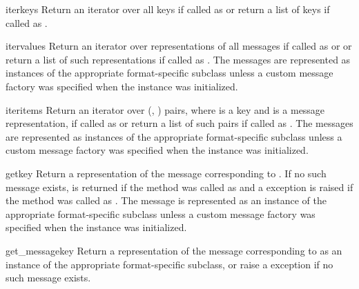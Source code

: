 \begin{methoddesc}{iterkeys}{}
Return an iterator over all keys if called as  or return a
list of keys if called as .
\end{methoddesc}

\begin{methoddesc}{itervalues}{}
Return an iterator over representations of all messages if called as
 or  or return a list of such
representations if called as . The messages are represented as
instances of the appropriate format-specific  subclass unless a
custom message factory was specified when the  instance was
initialized. 
\end{methoddesc}

\begin{methoddesc}{iteritems}{}
Return an iterator over (, ) pairs, where  is a
key and  is a message representation, if called as
 or return a list of such pairs if called as
. The messages are represented as instances of the appropriate
format-specific  subclass unless a custom message factory was
specified when the  instance was initialized.
\end{methoddesc}

\begin{methoddesc}{get}{key}
Return a representation of the message corresponding to . If no such
message exists,  is returned if the method was called as
 and a  exception is raised if the method was
called as . The message is represented as an instance of
the appropriate format-specific  subclass unless a custom
message factory was specified when the  instance was
initialized.
\end{methoddesc}

\begin{methoddesc}{get_message}{key}
Return a representation of the message corresponding to  as an
instance of the appropriate format-specific  subclass, or raise
a  exception if no such message exists.
\end{methoddesc}

